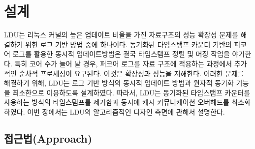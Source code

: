 \section{설계}
\label{sec:ldu}



LDU는 리눅스 커널의 높은 업데이트 비율을 가진 자료구조의 성능 확장성 문제를 
해결하기 위한 로그 기반 방법 중에 하나이다.
동기화된 타임스탬프 카운터 기반의 퍼코어 로그를 활용한 동시적 업데이트방법은 결국 
타임스탬프 정렬 및 머징 작업을 야기한다.
특히 코어 수가 늘어 날 경우, 퍼코어 로그를 자료 구조에 적용하는 과정에서 추가적인 순차적 프로세싱이 요구된다.
이것은 확장성과 성능을 저해한다. 
이러한 문제를 해결하기 위해, LDU는 로그 기반 방식의 동시적 업데이트 방법과 
원자적 동기화 기능을 최소한으로 이용하도록 설계하였다.
따라서, LDU는 동기화된 타임스탬프 카운터를 사용하는 방식의 타임스탬프를
제거함과 동시에 캐시 커뮤니케이션 오버헤드를 최소화하였다.
이번 장에서는 LDU의 알고리즘적인 디자인 측면에 관해서 설명한다. 

\subsection{접근법(Approach)}



